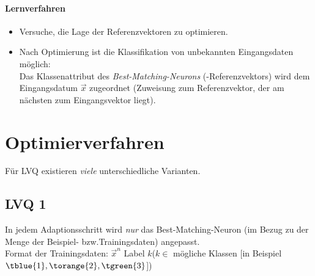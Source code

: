 \paragraph{Lernverfahren} 
\begin{itemize}
\item Versuche, die Lage der Referenzvektoren zu optimieren.
\item Nach Optimierung ist die Klassifikation von unbekannten Eingangsdaten möglich:\\
Das Klassenattribut des \emph{Best-Matching-Neurons} (-Referenzvektors) wird dem Eingangsdatum $\vec{x}$ zugeordnet (Zuweisung zum Referenzvektor, der am nächsten zum Eingangsvektor liegt).
\end{itemize}

\section{Optimierverfahren}
Für LVQ existieren \emph{viele} unterschiedliche Varianten.

\subsection{LVQ 1}
In jedem Adaptionsschritt  wird \emph{nur} das Best-Matching-Neuron (im Bezug zu der Menge der Beispiel- bzw.Trainingsdaten) angepasst.\\
Format der Trainingsdaten: $\vec{x}^{n}$ Label $k$\quad($k \in $ mögliche Klassen [in Beispiel $\tblue{1}, \torange{2}, \tgreen{3}$])

